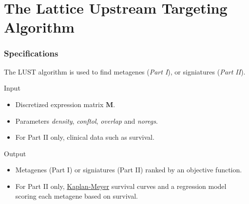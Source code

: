 \documentclass[
	11pt, %
]{beamer}
\begin{document}
\section{The Lattice Upstream Targeting Algorithm}

\begin{frame}
	\frametitle{Specifications}
	\begin{block}{}
        The LUST algorithm is used to find metagenes (\emph{Part I}), or signiatures (\emph{Part II}).
    \end{block}
    \pause
    \begin{block}{Input}
        \begin{itemize}
            \item Discretized expression matrix $\mathbf{M}$.
            \item Parameters \emph{density}, \emph{conftol}, \emph{overlap} and \emph{noregs}.
            \item For Part II only, clinical data such as survival.
        \end{itemize}
    \end{block}
    \pause
    \begin{block}{Output}
        \begin{itemize}
            \item Metagenes (Part I) or signiatures (Part II) ranked by an objective function.
            \item For Part II only, \href{https://www.mygreatlearning.com/blog/kaplan-meier-curve-explained}{Kaplan-Meyer} survival curves and a regression model scoring each metagene based on survival.
        \end{itemize}
    \end{block}
\end{frame}
\end{document}
